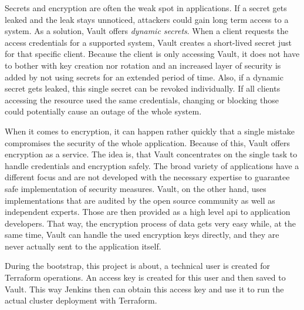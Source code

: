 Secrets and encryption are often the weak spot in applications.
If a secret gets leaked and the leak stays unnoticed, attackers could gain long term access to a system.
As a solution, Vault offers \emph{dynamic secrets}.
When a client requests the access credentials for a supported system, Vault creates a short-lived secret just for that specific client.
Because the client is only accessing Vault, it does not have to bother with key creation nor rotation and an increased layer of security is added by not using secrets for an extended period of time.
Also, if a dynamic secret gets leaked, this single secret can be revoked individually.
If all clients accessing the resource used the same credentials, changing or blocking those could potentially cause an outage of the whole system.

When it comes to encryption, it can happen rather quickly that a single mistake compromises the security of the whole application.
Because of this, Vault offers encryption as a service.
The idea is, that Vault concentrates on the single task to handle credentials and encryption safely.
The broad variety of applications have a different focus and are not developed with the necessary expertise to guarantee safe implementation of security measures.
Vault, on the other hand, uses implementations that are audited by the open source community as well as independent experts.
Those are then provided as a high level \ac{api} to application developers.
That way, the encryption process of data gets very easy while, at the same time, Vault can handle the used encryption keys directly, and they are never actually sent to the application itself. \cite{vaultproject.io}

During the bootstrap, this project is about, a technical user is created for Terraform operations.
An access key is created for this user and then saved to Vault.
This way Jenkins then can obtain this access key and use it to run the actual cluster deployment with Terraform.

    

